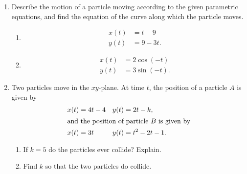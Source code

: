 \documentclass[11pt]{article}
\begin{document}
\begin{enumerate}
\item Describe the motion of a particle moving according to the given
  parametric equations, and find the equation of the curve along which
  the particle moves.
  
  \begin{enumerate}
  \item 
    \begin{align*}
      x(t) &= t - 9\\
      y(t) &= 9 - 3t.
    \end{align*}
    \vfill
  \item
    \begin{align*}
      x(t) &= 2\cos(-t)\\
      y(t) &= 3\sin(-t).
    \end{align*}
    \vfill
  \end{enumerate}
  \newpage
  
\item Two particles move in the $xy$-plane.  At time $t$, the position
  of a particle $A$ is given by
  \begin{align*}
    x(t) &= 4t-4 & y(t) &= 2t-k,\\
    \intertext{and the position of particle $B$ is given by}
    x(t) &= 3t & y(t) &= t^2-2t-1.
  \end{align*}

  \begin{enumerate}
  \item If $k=5$ do the particles ever collide?  Explain.
    \vfill
  \item Find $k$ so that the two particles do collide.
    \vfill
  \end{enumerate}

\end{enumerate}
\end{document}
